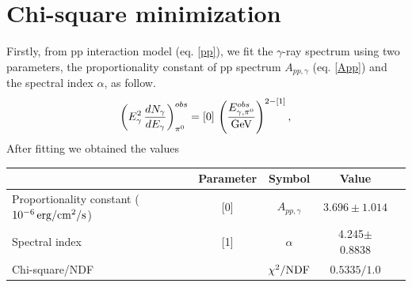 \documentclass[useAMS,usenatbib,a4]{mn2e}
\begin{document}
\section{Chi-square minimization}
%
Firstly, from pp interaction model  (eq. \ref{pp}),  we fit the $\gamma$-ray spectrum  using two parameters, the proportionality constant of pp spectrum $A_{pp,\gamma}$ (eq. \ref{App}) and the spectral index $\alpha$, as follow.
%
\begin{equation}
\label{ppf}
\left(E^{2}_\gamma\, \frac{dN_\gamma}{dE_\gamma}\right)^{obs}_{\pi^0}=[0]\, \left(\frac{E^{obs}_{\gamma,\pi^0}}{{\rm GeV}}\right)^{2-[1]},
\end{equation}
%
After fitting we obtained the values
%
\begin{center}\renewcommand{\arraystretch}{0.7}\addtolength{\tabcolsep}{-1pt}
\begin{tabular}{ l c c c c}
 \hline \hline
 \scriptsize{} &\scriptsize{Parameter} & \scriptsize{Symbol} & \scriptsize{Value} \\
 \hline
\hline
\scriptsize{Proportionality constant} ($10^{-6}\,{\rm erg/cm^2/s}$)  &\scriptsize{[0]}                    & \scriptsize{$ A_{pp,\gamma} $}  &  \scriptsize{ $3.696\pm 1.014$} \\
\scriptsize{Spectral index}                                                                 &\scriptsize{[1]}                    & \scriptsize{$\alpha$}  & \scriptsize{4.245$\pm$ 0.8838}  \\
\scriptsize{Chi-square/NDF}                                                              & & \scriptsize{$ \chi^2/{\rm NDF}$}  &  \scriptsize{ $0.5335/1.0$} \\

 \hline

\end{tabular}
\end{center}
\end{document}
